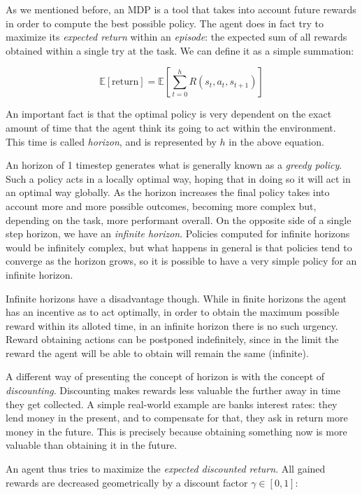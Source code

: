As we mentioned before, an MDP is a tool that takes into account future rewards in order to compute
the best possible policy. The agent does in fact try to maximize its \textit{expected return} within
an \textit{episode}: the expected sum of all rewards obtained within a single try at the task. We
can define it as a simple summation:

\[ \mathbb{E}[\text{return}] = \mathbb{E} \left [ \sum_{t=0}^h R(s_t, a_t, s_{t+1}) \right ] \]

An important fact is that the optimal policy is very dependent on the exact amount of time that the
agent think its going to act within the environment. This time is called \textit{horizon}, and is
represented by $h$ in the above equation.

An horizon of 1 timestep generates what is generally known as a \textit{greedy policy}. Such a
policy acts in a locally optimal way, hoping that in doing so it will act in an optimal way
globally. As the horizon increases the final policy takes into account more and more possible
outcomes, becoming more complex but, depending on the task, more performant overall. On the opposite
side of a single step horizon, we have an \textit{infinite horizon}. Policies computed for infinite
horizons would be infinitely complex, but what happens in general is that policies tend to converge
as the horizon grows, so it is possible to have a very simple policy for an infinite horizon.

Infinite horizons have a disadvantage though. While in finite horizons the agent has an incentive as
to act optimally, in order to obtain the maximum possible reward within its alloted time, in an
infinite horizon there is no such urgency. Reward obtaining actions can be postponed indefinitely,
since in the limit the reward the agent will be able to obtain will remain the same (infinite).

A different way of presenting the concept of horizon is with the concept of \textit{discounting}.
Discounting makes rewards less valuable the further away in time they get collected. A simple
real-world example are banks interest rates: they lend money in the present, and to compensate for
that, they ask in return more money in the future. This is precisely because obtaining something now
is more valuable than obtaining it in the future.

An agent thus tries to maximize the \textit{expected discounted return}. All gained rewards are
decreased geometrically by a discount factor $\gamma \in [0,1]$:

